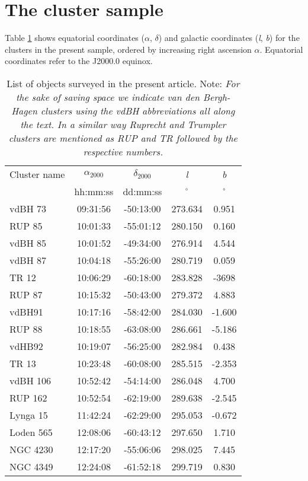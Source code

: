 \documentclass{aa}
\begin{document}
\section{The cluster sample}
\label{sec:clust_sample}

Table \ref{tab:clust_list} shows equatorial coordinates ($\alpha$, $\delta$) and
galactic coordinates (\textit{l}, \textit{b}) for the clusters in the present
sample, ordered by increasing right ascension $\alpha$. Equatorial coordinates
refer to the J2000.0 equinox.

\begin{table}[ht]
    \centering
    \begin{tabular}{lcccc}
    \hline 
        Cluster name & $\alpha_{2000}$ & $\delta_{2000}$ & \emph{l} & \emph{b}\\
         & hh:mm:ss & dd:mm:ss & $^\circ$ & $^\circ$\\
       \hline \hline 
        vdBH 73 & 09:31:56 & -50:13:00 & 273.634 & 0.951\\
        RUP 85 & 10:01:33 & -55:01:12 &280.150 & 0.160\\
        vdBH 85 & 10:01:52 & -49:34:00 & 276.914 & 4.544\\
        vdBH 87 & 10:04:18 & -55:26:00 & 280.719 & 0.059\\
        TR 12 & 10:06:29 & -60:18:00 & 283.828 & -3698\\
        RUP 87 & 10:15:32 & -50:43:00 & 279.372 & 4.883\\
        vdBH91 & 10:17:16 & -58:42:00 & 284.030 & -1.600\\
        RUP 88 & 10:18:55 & -63:08:00 & 286.661 & -5.186\\
        vdHB92 & 10:19:07 & -56:25:00 & 282.984 & 0.438\\
        TR 13 & 10:23:48 & -60:08:00 & 285.515 & -2.353\\
        vdBH 106 & 10:52:42 & -54:14:00 & 286.048 & 4.700\\
        RUP 162 & 10:52:54 & -62:19:00 & 289.638 & -2.545\\
        Lynga 15 & 11:42:24 & -62:29:00 & 295.053 & -0.672\\
        Loden 565 & 12:08:06 & -60:43:12 & 297.650 & 1.710\\
        NGC 4230 & 12:17:20 & -55:06:06 & 298.025 & 7.445\\
        NGC 4349 & 12:24:08 & -61:52:18 & 299.719 & 0.830\\
        \hline
    \end{tabular}
    \caption{List of objects surveyed in the present article.
    Note: \textit{For the sake of saving space we indicate van den Bergh-Hagen
    clusters using the vdBH abbreviations all along the text. In a similar
    way Ruprecht and Trumpler clusters are mentioned as RUP and TR followed
    by the respective numbers.}}
    \label{tab:clust_list}
\end{table}
\end{document}
